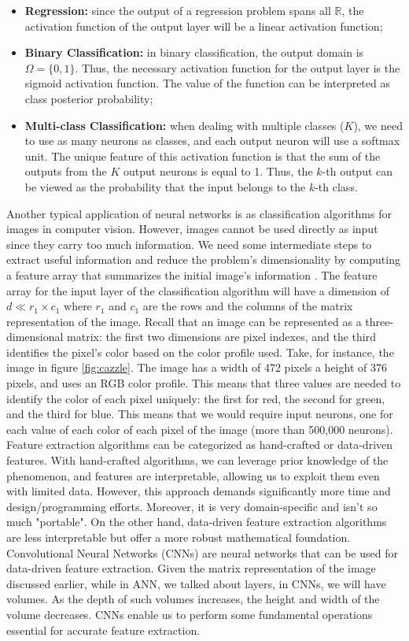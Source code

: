 \begin{itemize}
    \item \textbf{Regression:} since the output of a regression problem spans all $\mathbb{R}$, the activation function of the output layer will be a linear activation function;
    \item \textbf{Binary Classification:} in binary classification, the output domain is $\Omega=\{0, 1\}$. Thus, the necessary activation function for the output layer is the sigmoid activation function. The value of the function can be interpreted as class posterior probability;
    \item \textbf{Multi-class Classification:} when dealing with multiple classes ($K$), we need to use as many neurons as classes, and each output neuron will use a softmax unit. The unique feature of this activation function is that the sum of the outputs from the $K$ output neurons is equal to 1. Thus, the $k$-th output can be viewed as the probability that the input belongs to the $k$-th class.
\end{itemize}
Another typical application of neural networks is as classification algorithms for images in computer vision. However, images cannot be used directly as input since they carry too much information. We need some intermediate steps to extract useful information and reduce the problem's dimensionality by computing a feature array that summarizes the initial image's information \cite{giacomo_boracchi_convolutional_2021}. The feature array for the input layer of the classification algorithm will have a dimension of $d\ll r_1 \times c_1$ where $r_1$ and $c_1$ are the rows and the columns of the matrix representation of the image. Recall that an image can be represented as a three-dimensional matrix: the first two dimensions are pixel indexes, and the third identifies the pixel's color based on the color profile used. Take, for instance, the image in figure \ref{fig:cazzle}. The image has a width of 472 pixels a height of 376 pixels, and uses an RGB color profile. This means that three values are needed to identify the color of each pixel uniquely: the first for red, the second for green, and the third for blue. This means that we would require  input neurons, one for each value of each color of each pixel of the image (more than 500,000 neurons). Feature extraction algorithms can be categorized as hand-crafted or data-driven features. With hand-crafted algorithms, we can leverage prior knowledge of the phenomenon, and features are interpretable, allowing us to exploit them even with limited data. However, this approach demands significantly more time and design/programming efforts. Moreover, it is very domain-specific and isn't so much "portable". On the other hand, data-driven feature extraction algorithms are less interpretable but offer a more robust mathematical foundation. Convolutional Neural Networks (CNNs) are neural networks that can be used for data-driven feature extraction. Given the matrix representation of the image discussed earlier, while in ANN, we talked about layers, in CNNs, we will have volumes. As the depth of such volumes increases, the height and width of the volume decreases. CNNs enable us to perform some fundamental operations essential for accurate feature extraction.
